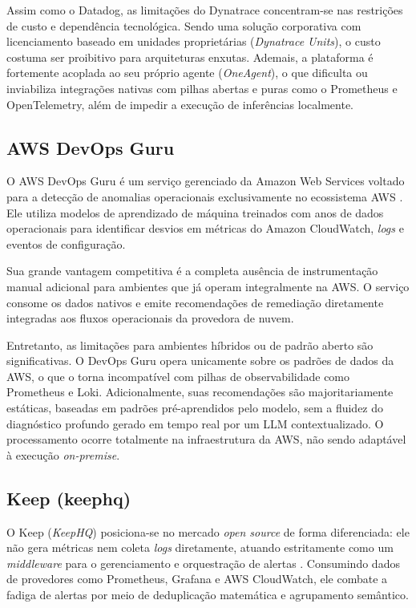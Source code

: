 Assim como o Datadog, as limitações do Dynatrace concentram-se nas restrições de custo e dependência tecnológica. Sendo uma solução corporativa com licenciamento baseado em unidades proprietárias (\textit{Dynatrace Units}), o custo costuma ser proibitivo para arquiteturas enxutas. Ademais, a plataforma é fortemente acoplada ao seu próprio agente (\textit{OneAgent}), o que dificulta ou inviabiliza integrações nativas com pilhas abertas e puras como o Prometheus e OpenTelemetry, além de impedir a execução de inferências localmente.

\subsection{AWS DevOps Guru}

O AWS DevOps Guru é um serviço gerenciado da Amazon Web Services voltado para a detecção de anomalias operacionais exclusivamente no ecossistema AWS \cite{aws2024devops}. Ele utiliza modelos de aprendizado de máquina treinados com anos de dados operacionais para identificar desvios em métricas do Amazon CloudWatch, \textit{logs} e eventos de configuração.

Sua grande vantagem competitiva é a completa ausência de instrumentação manual adicional para ambientes que já operam integralmente na AWS. O serviço consome os dados nativos e emite recomendações de remediação diretamente integradas aos fluxos operacionais da provedora de nuvem.

Entretanto, as limitações para ambientes híbridos ou de padrão aberto são significativas. O DevOps Guru opera unicamente sobre os padrões de dados da AWS, o que o torna incompatível com pilhas de observabilidade como Prometheus e Loki. Adicionalmente, suas recomendações são majoritariamente estáticas, baseadas em padrões pré-aprendidos pelo modelo, sem a fluidez do diagnóstico profundo gerado em tempo real por um LLM contextualizado. O processamento ocorre totalmente na infraestrutura da AWS, não sendo adaptável à execução \textit{on-premise}.

\subsection{Keep (keephq)}

O Keep (\textit{KeepHQ}) posiciona-se no mercado \textit{open source} de forma diferenciada: ele não gera métricas nem coleta \textit{logs} diretamente, atuando estritamente como um \textit{middleware} para o gerenciamento e orquestração de alertas \cite{keep2025}. Consumindo dados de provedores como Prometheus, Grafana e AWS CloudWatch, ele combate a fadiga de alertas por meio de deduplicação matemática e agrupamento semântico.

